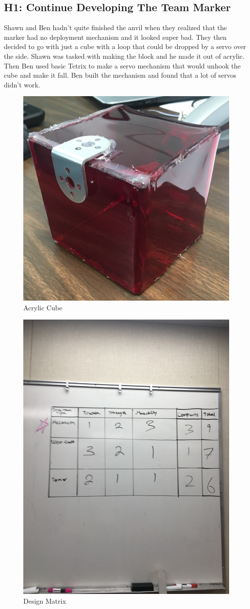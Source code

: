 \documentclass{article}
\begin{document}
\subsection{H1: Continue Developing The Team Marker}

Shawn and Ben hadn't quite finished the anvil when they realized that the marker had no deployment mechanism and it looked super bad. They then decided to go with just a cube with a loop that could be dropped by a servo over the side. Shawn was tasked with making the block and he made it out of acrylic. Then Ben used basic Tetrix to make a servo mechanism that would unhook the cube and make it fall. Ben built the mechanism and found that a lot of servos didn't work.

\begin{figure}
    \centering
    \includegraphics[width=.6\textwidth]{05_10-01/images/cube.jpg}
    \caption{Acrylic Cube}
    \label{fig:cube}
\end{figure}

\begin{figure}
    \centering
    \includegraphics[width=.5\textwidth]{05_10-01/images/Drive.JPG}
    \caption{Design Matrix}
    \label{fig:Metrix}
\end{figure}
\end{document}
